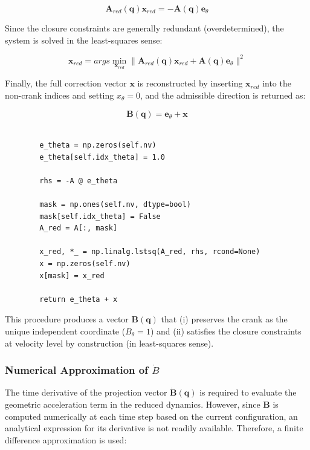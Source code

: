 \begin{equation*}
    \textbf{A}_{red}(\textbf{q})\textbf{x}_{red} = -\textbf{A}(\textbf{q})\textbf{e}_{\theta}
\end{equation*}

Since the closure constraints are generally redundant (overdetermined), the system is solved in the least-squares sense:

\begin{equation*}
    \textbf{x}_{red} = args\min_{\textbf{x}_{red}} \|\textbf{A}_{red}(\textbf{q})\textbf{x}_{red} + \textbf{A}(\textbf{q})\textbf{e}_{\theta}\|^2
\end{equation*}

Finally, the full correction vector $\textbf{x}$ is reconstructed by inserting $\textbf{x}_{red}$ into the non-crank indices and setting $x_{\theta} = 0$, and the admissible direction is returned as:

\begin{equation*}
    \textbf{B}(\textbf{q}) = \textbf{e}_{\theta} + \textbf{x}
\end{equation*}

\begin{verbatim}

        e_theta = np.zeros(self.nv)
        e_theta[self.idx_theta] = 1.0

        rhs = -A @ e_theta

        mask = np.ones(self.nv, dtype=bool)
        mask[self.idx_theta] = False
        A_red = A[:, mask]

        x_red, *_ = np.linalg.lstsq(A_red, rhs, rcond=None)
        x = np.zeros(self.nv)
        x[mask] = x_red

        return e_theta + x

\end{verbatim}

This procedure produces a vector $\textbf{B}(\textbf{q})$ that (i) preserves the crank as the unique independent coordinate ($B_{\theta} = 1$) and (ii) satisfies the closure constraints at velocity level by construction (in least-squares sense).

\subsubsection*{Numerical Approximation of $\dot{B}$}
The time derivative of the projection vector $\dot{\textbf{B}}(\textbf{q})$ is required to evaluate the geometric acceleration term in the reduced dynamics. However, since $\textbf{B}$ is computed numerically at each time step based on the current configuration, an analytical expression for its derivative is not readily available. Therefore, a finite difference approximation is used:

